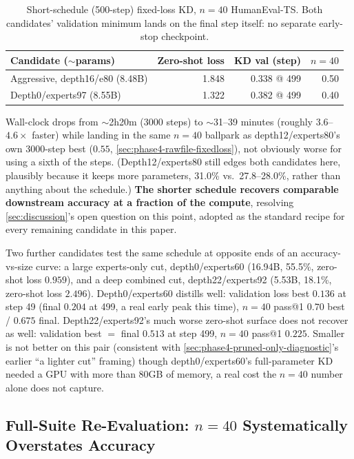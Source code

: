 \documentclass{article}
\theoremstyle{plain}
\theoremstyle{definition}
\theoremstyle{remark}
\begin{document}
\begin{table}[t]
\centering
\scriptsize
\setlength{\tabcolsep}{3pt}
\begin{tabular}{lrrr}
\toprule
Candidate ($\sim$params) & Zero-shot loss & KD val (step) & $n{=}40$ \\
\midrule
Aggressive, depth16/e80 (8.48B) & 1.848 & 0.338 @ 499 & 0.50 \\
Depth0/experts97 (8.55B) & 1.322 & 0.382 @ 499 & 0.40 \\
\bottomrule
\end{tabular}
\caption{Short-schedule (500-step) fixed-loss KD, $n{=}40$ HumanEval-TS.
Both candidates' validation minimum lands on the final step itself:
no separate early-stop checkpoint.}
\label{table:phase4-short-schedule}
\end{table}

Wall-clock drops from $\sim$2h20m (3000 steps) to $\sim$31--39 minutes
(roughly $3.6$--$4.6\times$ faster) while landing in the same $n{=}40$
ballpark as depth12/experts80's own 3000-step best ($0.55$,
\cref{sec:phase4-rawfile-fixedloss}), not obviously worse for using a
sixth of the steps. (Depth12/experts80 still edges both candidates here,
plausibly because it keeps more parameters, 31.0\% vs.\ 27.8--28.0\%,
rather than anything about the schedule.) \textbf{The shorter schedule
recovers comparable downstream accuracy at a fraction of the compute},
resolving \cref{sec:discussion}'s open question on this point, adopted
as the standard recipe for every remaining candidate in this paper.

Two further candidates test the same schedule at opposite ends of an
accuracy-vs-size curve: a large experts-only cut, depth0/experts60
(16.94B, 55.5\%, zero-shot loss $0.959$), and a deep combined cut,
depth22/experts92 (5.53B, 18.1\%, zero-shot loss $2.496$).
Depth0/experts60 distills well: validation loss best $0.136$ at step 49
(final $0.204$ at 499, a real early peak this time), $n{=}40$ pass@1
$0.70$ best / $0.675$ final. Depth22/experts92's much worse zero-shot
surface does not recover as well: validation best $=$ final $0.513$ at
step 499, $n{=}40$ pass@1 $0.225$. Smaller is not better on this pair
(consistent with \cref{sec:phase4-pruned-only-diagnostic}'s earlier
``a lighter cut'' framing) though depth0/experts60's full-parameter KD
needed a GPU with more than 80GB of memory, a real cost the $n{=}40$
number alone does not capture.

\subsection{Full-Suite Re-Evaluation: $n{=}40$ Systematically Overstates Accuracy}
\label{sec:phase4-full-suite-noise}
\end{document}
